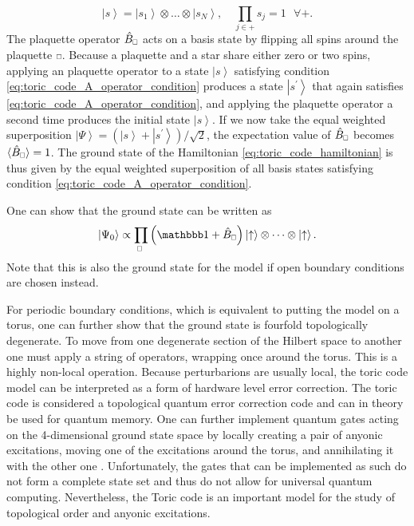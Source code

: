 \begin{equation}
	\label{eq:toric_code_A_operator_condition}
	\left|s\right\rangle = \left|s_1\right\rangle \otimes \dots \otimes \left|s_N\right\rangle, \quad \prod_{j\in+}s_j = 1 \,\,\,\,\forall +.
\end{equation}
The plaquette operator $\hat{B}_{\scalebox{0.6}{$\square$}}$ acts on a basis state by flipping all spins around the plaquette $\scalebox{0.6}{$\square$}$. Because a plaquette and a star share either zero or two spins, applying an plaquette operator to a state $\left|s\right\rangle$ satisfying condition \eqref{eq:toric_code_A_operator_condition} produces a state $\left|s^\prime\right\rangle$ that again satisfies \eqref{eq:toric_code_A_operator_condition}, and applying the plaquette operator a second time produces the initial state $\left|s\right\rangle$. If we now take the equal weighted superposition $\left|\Psi\right\rangle = \left(\left|s\right\rangle+\left| s^\prime\right\rangle\right)/\sqrt{2}$, the expectation value of $\hat{B}_{\scalebox{0.6}{$\square$}}$ becomes $\langle \hat{B}_{\scalebox{0.6}{$\square$}}\rangle = 1$.
The ground state of the Hamiltonian \eqref{eq:toric_code_hamiltonian} is thus given by the equal weighted superposition of all basis states satisfying condition \eqref{eq:toric_code_A_operator_condition}. \par
One can show that the ground state can be written as
\begin{equation}
	\left|\Psi_0\right\rangle \propto \prod_{\scalebox{0.6}{$\square$}}\left(\id + \hat{B}_{\scalebox{0.6}{$\square$}}\right) \left|\uparrow\right\rangle \otimes \dots \otimes \left|\uparrow\right\rangle.
\end{equation}
Note that this is also the ground state for the model if open boundary conditions are chosen instead. \par
For periodic boundary conditions, which is equivalent to putting the model on a torus, one can further show that the ground state is fourfold topologically degenerate. To move from one degenerate section of the Hilbert space to another one must apply a string of operators, wrapping once around the torus. This is a highly non-local operation. Because perturbarions are usually local, the toric code model can be interpreted as a form of hardware level error correction. The toric code is considered a topological quantum error correction code and can in theory be used for quantum memory. One can further implement quantum gates acting on the 4-dimensional ground state space by locally creating a pair of anyonic excitations, moving one of the excitations around the torus, and annihilating it with the other one \cite{cite:fault_tolerant_quantum_computation_by_anyons}. Unfortunately, the gates that can be implemented as such do not form a complete state set and thus do not allow for universal quantum computing. Nevertheless, the Toric code is an important model for the study of topological order and anyonic excitations.
